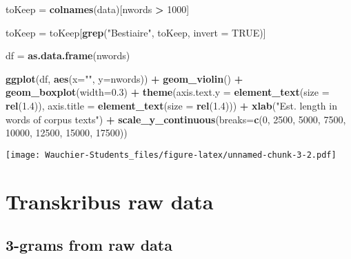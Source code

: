 \documentclass[]{article}
\newenvironment{Shaded}{\begin{snugshade}}{\end{snugshade}}
\newcommand{\DataTypeTok}[1]{\textcolor[rgb]{0.13,0.29,0.53}{#1}}
\newcommand{\DecValTok}[1]{\textcolor[rgb]{0.00,0.00,0.81}{#1}}
\newcommand{\FloatTok}[1]{\textcolor[rgb]{0.00,0.00,0.81}{#1}}
\newcommand{\KeywordTok}[1]{\textcolor[rgb]{0.13,0.29,0.53}{\textbf{#1}}}
\newcommand{\NormalTok}[1]{#1}
\newcommand{\OperatorTok}[1]{\textcolor[rgb]{0.81,0.36,0.00}{\textbf{#1}}}
\newcommand{\OtherTok}[1]{\textcolor[rgb]{0.56,0.35,0.01}{#1}}
\newcommand{\StringTok}[1]{\textcolor[rgb]{0.31,0.60,0.02}{#1}}
\begin{document}
\begin{Shaded}
\begin{Highlighting}[]
\NormalTok{toKeep =}\StringTok{ }\KeywordTok{colnames}\NormalTok{(data)[nwords }\OperatorTok{>}\StringTok{ }\DecValTok{1000}\NormalTok{]}

\NormalTok{toKeep =}\StringTok{ }\NormalTok{toKeep[}\KeywordTok{grep}\NormalTok{(}\StringTok{"Bestiaire"}\NormalTok{, toKeep, }\DataTypeTok{invert =} \OtherTok{TRUE}\NormalTok{)]}

\NormalTok{df =}\StringTok{ }\KeywordTok{as.data.frame}\NormalTok{(nwords)}

\KeywordTok{ggplot}\NormalTok{(df, }\KeywordTok{aes}\NormalTok{(}\DataTypeTok{x=}\StringTok{""}\NormalTok{, }\DataTypeTok{y=}\NormalTok{nwords)) }\OperatorTok{+}\StringTok{ }\KeywordTok{geom_violin}\NormalTok{() }\OperatorTok{+}\StringTok{ }\KeywordTok{geom_boxplot}\NormalTok{(}\DataTypeTok{width=}\FloatTok{0.3}\NormalTok{) }\OperatorTok{+}\StringTok{  }\KeywordTok{theme}\NormalTok{(}\DataTypeTok{axis.text.y =} \KeywordTok{element_text}\NormalTok{(}\DataTypeTok{size =} \KeywordTok{rel}\NormalTok{(}\FloatTok{1.4}\NormalTok{)), }\DataTypeTok{axis.title =} \KeywordTok{element_text}\NormalTok{(}\DataTypeTok{size =} \KeywordTok{rel}\NormalTok{(}\FloatTok{1.4}\NormalTok{))) }\OperatorTok{+}\StringTok{ }\KeywordTok{xlab}\NormalTok{(}\StringTok{"Est. length in words of corpus texts"}\NormalTok{) }\OperatorTok{+}\StringTok{ }\KeywordTok{scale_y_continuous}\NormalTok{(}\DataTypeTok{breaks=}\KeywordTok{c}\NormalTok{(}\DecValTok{0}\NormalTok{, }\DecValTok{2500}\NormalTok{, }\DecValTok{5000}\NormalTok{, }\DecValTok{7500}\NormalTok{, }\DecValTok{10000}\NormalTok{, }\DecValTok{12500}\NormalTok{, }\DecValTok{15000}\NormalTok{, }\DecValTok{17500}\NormalTok{))}
\end{Highlighting}
\end{Shaded}

\texttt{[image: Wauchier-Students\_files/figure-latex/unnamed-chunk-3-2.pdf]}

\hypertarget{transkribus-raw-data}{%
\section{Transkribus raw data}\label{transkribus-raw-data}}

\hypertarget{grams-from-raw-data}{%
\subsection{3-grams from raw data}\label{grams-from-raw-data}}
\end{document}
